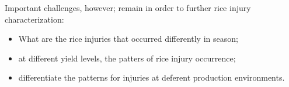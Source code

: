 Important challenges, however; remain in order to further rice injury characterization:
\begin{itemize}
\item What are the rice injuries that occurred differently in season;
\item at different yield levels, the patters of rice injury occurrence;
\item differentiate the patterns for injuries at deferent production environments. 
\end{itemize}
